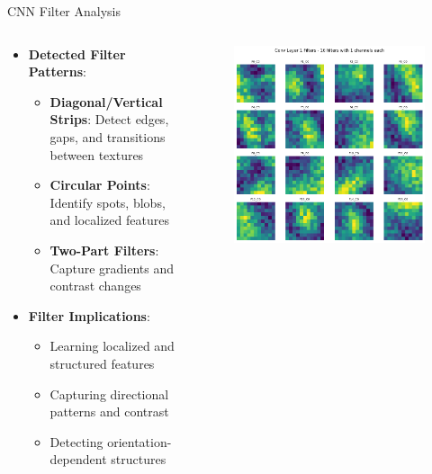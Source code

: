 \documentclass[aspectratio=169,8pt]{beamer}  %
\begin{document}
\begin{frame}{CNN Filter Analysis}
\begin{columns}[T]
\begin{column}{0.6\textwidth}
\begin{itemize}
\item \textbf{Detected Filter Patterns}:
  \begin{itemize}
  \item \textbf{Diagonal/Vertical Strips}: Detect edges, gaps, and transitions between textures
  \item \textbf{Circular Points}: Identify spots, blobs, and localized features
  \item \textbf{Two-Part Filters}: Capture gradients and contrast changes
  \end{itemize}
\item \textbf{Filter Implications}:
  \begin{itemize}
  \item Learning localized and structured features
  \item Capturing directional patterns and contrast
  \item Detecting orientation-dependent structures
  \end{itemize}
\end{itemize}
\end{column}
\begin{column}{0.4\textwidth}
\begin{figure}
\includegraphics[width=\textwidth]{imgs/cnn_filters.png}
\end{figure}
\end{column}
\end{columns}
\end{frame}
\end{document}
